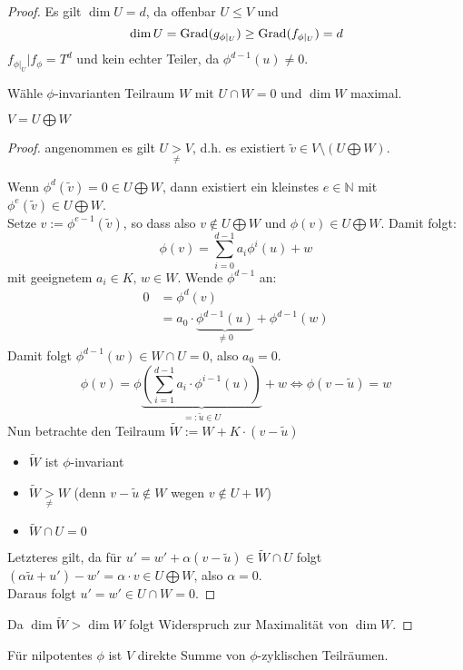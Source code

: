 \documentclass[parskip,a4paper,twoside,DIV15,BCOR12mm]{scrbook}
\begin{document}
\begin{proof}
Es gilt \(\dim U=d\), da offenbar \(U\leq V\) und
\[
\dim U=\operatorname{Grad}(g_{\phi|_{U}})\geq\operatorname{Grad}(f_{\phi|_{U}})=d
\]
\(f_{\phi|_{U}}\vert f_{\phi}=T^{d}\) und kein echter Teiler, da 
\(\phi^{d-1}(u)\neq0\).

Wähle \(\phi\)-invarianten Teilraum \(W\) mit \(U\cap W=0\) und \(\dim W\)
maximal.
\begin{thesis}
\(V=U\bigoplus W\)
\end{thesis}
\begin{proof}
angenommen es gilt \(U\underset{\neq}{>}V\), d.h. es existiert
\(\tilde{v}\in V\setminus(U\bigoplus W)\).

Wenn \(\phi^{d}(\tilde{v})=0\in U\bigoplus W\), dann existiert ein kleinstes
\(e\in\mathbb{N}\) mit \(\phi^{e}(\tilde{v})\in U\bigoplus W\).\\
Setze \(v:=\phi^{e-1}(\tilde{v})\), so dass also 
\(v\not\in U\bigoplus W\) und \(\phi(v)\in U\bigoplus W\). Damit folgt:
\[
\phi(v)=\sum_{i=0}^{d-1}{a_{i}\phi^{i}(u)+w}
\]
mit geeignetem \(a_{i}\in K,\,w\in W\). Wende \(\phi^{d-1}\) an:
\begin{align*}
0&=\phi^{d}(v)\\
&=a_{0}\cdot\underbrace{\phi^{d-1}(u)}_{\neq0}+\phi^{d-1}(w)
\end{align*}
Damit folgt \(\phi^{d-1}(w)\in W\cap U=0\), also \(a_{0}=0\).
\[
\phi(v)=\phi\underbrace{\left(
    \sum_{i=1}^{d-1}{a_{i}\cdot\phi^{i-1}(u)}\right)}_{=:\tilde{u}\in U}+w
\Longleftrightarrow\phi(v-\tilde{u})=w
\]
Nun betrachte den Teilraum \(\tilde{W}:=W+K\cdot(v-\tilde{u})\)
\begin{itemize}
\item \(\tilde{W}\) ist \(\phi\)-invariant
\item \(\tilde{W}\underset{\neq}{>}W\) (denn \(v-\tilde{u}\not\in W\) wegen
\(v\not\in U+W\))
\item \(\tilde{W}\cap U=0\)
\end{itemize}
Letzteres gilt, da für \(u'=w'+\alpha(v-\tilde{u})\in\tilde{W}\cap U\) folgt
\(\left(\alpha\tilde{u}+u'\right)-w'=\alpha\cdot v\in U\bigoplus W\), also 
\(\alpha=0\).\\
Daraus folgt \(u'=w'\in U\cap W=0\).
\end{proof}
Da \(\dim\tilde{W}>\dim W\) folgt Widerspruch zur Maximalität von \(\dim W\).
\end{proof}
\begin{conclusion}
Für nilpotentes \(\phi\) ist \(V\) direkte Summe von \(\phi\)-zyklischen
Teilräumen.
\end{conclusion}
\end{document}
